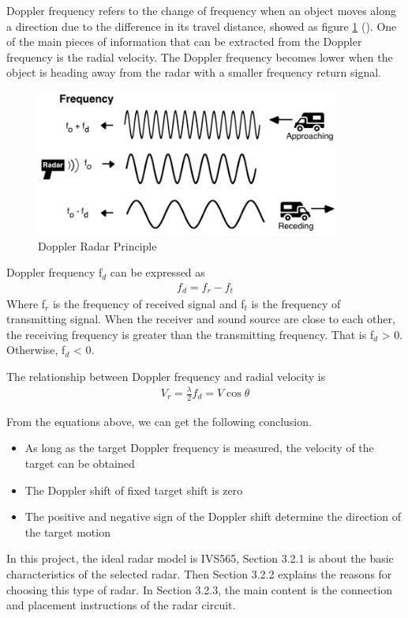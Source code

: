  Doppler frequency refers to the change of frequency when an object moves along a direction due to the difference in its travel distance, showed as figure \ref{fig:doppler} (\cite{DopplerRader}). One of the main pieces of information that can be extracted from the Doppler frequency is the radial velocity. The Doppler frequency becomes lower when the object is heading away from the radar with a smaller frequency return signal.
 \begin{figure}[H]
    \centering
    \includegraphics[width=10cm]{figure/Radar.png}
    \caption{Doppler Radar Principle}
    \label{fig:doppler}
\end{figure}
Doppler frequency f$_d$ can be expressed as
\begin{align}
    f_{d}=f_{r}-f_{t}
\end{align}
Where f$_r$ is the frequency of received signal and f$_t$ is the frequency of transmitting signal. When the receiver and sound source are close to each other, the receiving frequency is greater than the transmitting frequency. That is f$_d$ > 0. Otherwise, f$_d$ < 0.

The relationship between Doppler frequency and  radial velocity is 
\begin{align}
V_{r}=\frac{\lambda}{2} f_{d}=V \cos \theta
\end{align}


From the equations above, we can get the following conclusion.
\begin{itemize}[noitemsep,topsep=0pt]
   \item As long as the target Doppler frequency is measured, the velocity of the target can be obtained
   \item The Doppler shift of fixed target  shift is zero
   \item The positive and negative sign of the Doppler shift determine the direction of the target motion
\end{itemize}

In this project, the ideal radar model is IVS565, Section 3.2.1 is about the basic characteristics of the selected radar. Then Section 3.2.2 explains the reasons for choosing this type of radar. In Section 3.2.3, the main content is the connection and placement instructions of the radar circuit.
